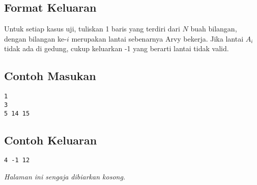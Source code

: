 \documentclass{article}
\begin{document}
\subsection*{Format Keluaran}

Untuk setiap kasus uji, tuliskan 1 baris yang terdiri dari $N$ buah bilangan, dengan bilangan ke-$i$ merupakan lantai sebenarnya Arvy bekerja.
Jika lantai $A_i$ tidak ada di gedung, cukup keluarkan -1 yang berarti lantai tidak valid.
\\

\begin{multicols}{2}
\subsection*{Contoh Masukan}
\begin{lstlisting}
1
3
5 14 15
\end{lstlisting}
\columnbreak
\subsection*{Contoh Keluaran}
\begin{lstlisting}
4 -1 12
\end{lstlisting}
\vfill
\null
\end{multicols}

\newpage
\vspace*{\fill}
\begin{center}
    \textit{Halaman ini sengaja dibiarkan kosong.}
\end{center}
\vspace*{\fill}
\end{document}

